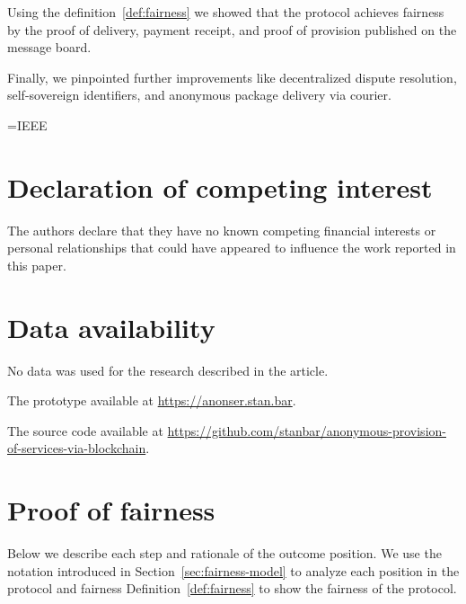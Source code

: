 Using the definition~\ref{def:fairness} we showed that the protocol achieves fairness by the proof of delivery, payment receipt, and proof of provision published on the message board. 

Finally, we pinpointed further improvements like decentralized dispute resolution, self-sovereign identifiers, and anonymous package delivery via courier.

\ifx\JOURNAL=IEEE

\appendices
\printbibliography
\else

\section*{Declaration of competing interest}
The authors declare that they have no known competing financial interests or personal relationships that could have appeared to influence the work reported in this paper.

\section*{Data availability}
No data was used for the research described in the article.

The prototype available at \url{https://anonser.stan.bar}. 

The source code available at \url{https://github.com/stanbar/anonymous-provision-of-services-via-blockchain}.

\printbibliography
\appendix
\fi

\section{Proof of fairness}\label{app:proof-of-fairness}
Below we describe each step and rationale of the outcome position.
We use the notation introduced in Section~\ref{sec:fairness-model} to analyze each position in the protocol and fairness Definition~\ref{def:fairness} to show the fairness of the protocol.

\newcommand{\AgreeablePath}{Agreeable path:}
\newcommand{\DisputePath}{The \customer{} starts a dispute:}
\newcommand{\Fairness}{Fairness:}
\newcommand{\CustomerTurn}[0]{\expandafter\MakeUppercase \customer{} turn:}
\newcommand{\SPTurn}[0]{\sp{} turn:}

\newcommand{\CanFollowToOne}[2]{The #1 can follow the protocol to the non-disadvantaged position #2}
\newcommand{\CanDoNothing}[1]{The #1 can do nothing and always ends up in the non-disadvantaged position}
\newcommand{\CanDoAnything}[1]{The #1 can do anything and always ends up in the non-disadvantaged position}
\newcommand{\Pos}[4]{$\operatorname{\sigma_{#1, #2, #3} = #4}$}
\newcommand{\WinForTheSameReason}[1]{The #1 wins the dispute for the same reason}
\newcommand{\LoseForTheSameReason}[1]{The #1 loses the dispute for the same reason}
\newcommand{\ActedAbnormallyThen}[1]{The #1 acted abnormally, then:}
\newcommand{\CustomerPaidButDidntGetResult}{the customer ends up in a disadvantaged position as he paid in advance but didn't receive the result}
\newcommand{\SpReceivedThePayment}{the SP ends up in the advantaged position as she received the payment}

